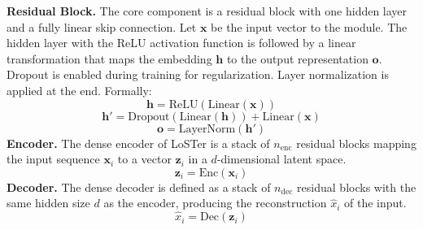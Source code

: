 \documentclass[times, review, 10pt]{elsarticle}
\begin{document}
\textbf{Residual Block.} The core component is a residual block with one hidden layer and a fully linear skip connection. Let $\mathbf{x}$ be the input vector to the module. The hidden layer with the ReLU activation function is followed by a linear transformation that maps the embedding $\mathbf{h}$ to the output representation $\mathbf{o}$. Dropout is enabled during training for regularization. Layer normalization is applied at the end. Formally:
%
\begin{equation}
\mathbf{h} = \text{ReLU}(\text{Linear}(\mathbf{x}))
\end{equation}
%
\begin{equation}
\mathbf{h'} = \text{Dropout}(\text{Linear}(\mathbf{h})) + \text{Linear}(\mathbf{x})
\end{equation}
%
\begin{equation}
\mathbf{o} = \text{LayerNorm}(\mathbf{h'})
\end{equation}
%
\textbf{Encoder.} The dense encoder  of LoSTer is a stack of $n_{\text{enc}}$ residual blocks mapping the input sequence $\mathbf{x}_i$ to a vector $\mathbf{z}_i$ in a $d$-dimensional latent space.
%
\begin{equation}
    \mathbf{z}_i = \text{Enc}(\mathbf{x}_i)
\end{equation}
%
\textbf{Decoder.} The dense decoder  is defined as a stack of $n_{\text{dec}}$ residual blocks with the same hidden size $d$ as the encoder, producing the reconstruction $\hat{x}_i$ of the input.
%
\begin{equation}
    \hat{x}_i = \text{Dec}(\mathbf{z}_i)
\end{equation}
\end{document}
